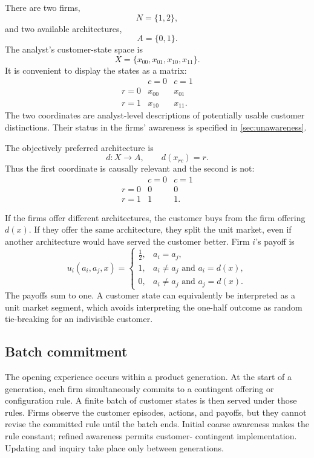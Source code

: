 \documentclass[11pt]{article}
\begin{document}
There are two firms,
\[
N=\{1,2\},
\]
and two available architectures,
\[
A=\{0,1\}.
\]
The analyst's customer-state space is
\[
X=\{x_{00},x_{01},x_{10},x_{11}\}.
\]
It is convenient to display the states as a matrix:
\[
\begin{array}{c|cc}
 & c=0 & c=1\\
\hline
r=0 & x_{00} & x_{01}\\
r=1 & x_{10} & x_{11}.
\end{array}
\]
The two coordinates are analyst-level descriptions of potentially usable
customer distinctions.  Their status in the firms' awareness is specified in
\cref{sec:unawareness}.

The objectively preferred architecture is
\begin{equation}
d:X\longrightarrow A,
\qquad
d(x_{rc})=r.
\label{eq:true-row-law}
\end{equation}
Thus the first coordinate is causally relevant and the second is not:
\[
\begin{array}{c|cc}
 & c=0 & c=1\\
\hline
r=0 & 0 & 0\\
r=1 & 1 & 1.
\end{array}
\]

If the firms offer different architectures, the customer buys from the firm
offering $d(x)$.  If they offer the same architecture, they split the unit
market, even if another architecture would have served the customer better.
Firm $i$'s payoff is
\begin{equation}
u_i(a_i,a_j,x)=
\begin{cases}
\frac12, & a_i=a_j,\\
1, & a_i\neq a_j\text{ and }a_i=d(x),\\
0, & a_i\neq a_j\text{ and }a_j=d(x).
\end{cases}
\label{eq:objective-payoff}
\end{equation}
The payoffs sum to one.  A customer state can equivalently be interpreted as a
unit market segment, which avoids interpreting the one-half outcome as random
tie-breaking for an indivisible customer.

\subsection{Batch commitment}

The opening experience occurs within a product generation.  At the start of a
generation, each firm simultaneously commits to a contingent offering or
configuration rule.  A finite batch of customer states is then served under
those rules.  Firms observe the customer episodes, actions, and payoffs, but
they cannot revise the committed rule until the batch ends.  Initial coarse
awareness makes the rule constant; refined awareness permits customer-
contingent implementation.  Updating and inquiry take place only between
generations.
\end{document}

